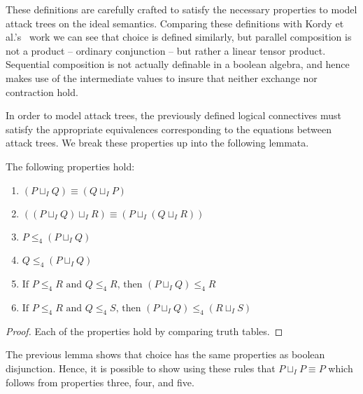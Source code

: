 These definitions are carefully crafted to satisfy the necessary
properties to model attack trees on the ideal semantics.  Comparing
these definitions with Kordy et al.'s~\cite{Kordy:2012} work we can
see that choice is defined similarly, but parallel composition is not
a product -- ordinary conjunction -- but rather a linear tensor
product. Sequential composition is not actually definable in a boolean
algebra, and hence makes use of the intermediate values to insure that
neither exchange nor contraction hold.

In order to model attack trees, the previously defined logical
connectives must satisfy the appropriate equivalences corresponding to
the equations between attack trees.  We break these properties up into
the following lemmata.

\begin{lemma}
  \label{lemma:basic_properties_for_choice}
  The following properties hold:
  \begin{enumerate}
  \item $(P \sqcup_I Q) \equiv (Q \sqcup_I P)$\\[-5px]
  \item $((P \sqcup_I Q) \sqcup_I R) \equiv (P \sqcup_I (Q \sqcup_I R))$\\[-5px]
  \item $P \leq_4 (P \sqcup_I Q)$\\[-5px]
  \item $Q \leq_4 (P \sqcup_I Q)$\\[-5px]
  \item $\text{If }P \leq_4 R \text{ and } Q \leq_4 R \text{, then } (P \sqcup_I Q) \leq_4 R$\\[-5px]
  \item $\text{If }P \leq_4 R \text{ and } Q \leq_4 S \text{, then } (P \sqcup_I Q) \leq_4 (R \sqcup_I S)$
  \end{enumerate}
\end{lemma}
\begin{proof}
  Each of the properties hold by comparing truth tables.
\end{proof}
The previous lemma shows that choice has the same properties as
boolean disjunction.  Hence, it is possible to show using these rules
that $P \sqcup_I P \equiv P$ which follows from properties three,
four, and five.
